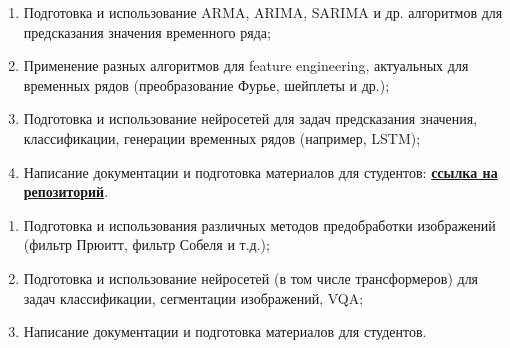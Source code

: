 \documentclass[letterpaper,11pt]{article}
\begin{document}

            \begin{enumerate}
                \item Подготовка и использование ARMA, ARIMA, SARIMA и др. алгоритмов для предсказания значения временного ряда;
                \item Применение разных алгоритмов для feature engineering, актуальных для временных рядов (преобразование Фурье, шейплеты и др.);
                \item Подготовка и использование нейросетей для задач предсказания значения, классификации, генерации временных рядов (например, LSTM);
                \item Написание документации и подготовка материалов для студентов: \href{https://github.com/marina-cyber/perm__ml_ai/tree/main/timeseries}{\textbf{ссылка на репозиторий}}.
            \end{enumerate}
        

            \begin{enumerate}
                \item Подготовка и использования различных методов предобработки изображений (фильтр Прюитт, фильтр Собеля и т.д.);
                \item Подготовка и использование нейросетей (в том числе трансформеров) для задач классификации, сегментации изображений, VQA;
                \item Написание документации и подготовка материалов для студентов.
            \end{enumerate}
        
    \resumeItemListEnd
    
\end{document}
